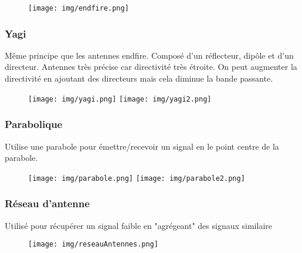 		\begin{figure}[H]
			\centering
			\texttt{[image: img/endfire.png]}
		\end{figure}
		
	\subsubsection{Yagi}
		Même principe que les antennes endfire. Composé d'un réflecteur, dipôle et d'un directeur. Antennes très précise car directivité très étroite. On peut augmenter la directivité en ajoutant des directeurs mais cela diminue la bande passante.
		
		\begin{figure}[H]
			\centering
			\texttt{[image: img/yagi.png]}
			\texttt{[image: img/yagi2.png]}
		\end{figure}
		
	\subsubsection{Parabolique}
	
		Utilise une parabole pour émettre/recevoir un signal en le point centre de la parabole.
		
		\begin{figure}[H]
			\centering
			\texttt{[image: img/parabole.png]}
			\texttt{[image: img/parabole2.png]}
		\end{figure}
	\subsubsection{Réseau d'antenne}
		Utilisé pour récupérer un signal faible en "agrégeant" des signaux similaire
		\begin{figure}[H]
			\centering
			\texttt{[image: img/reseauAntennes.png]}
		\end{figure}
